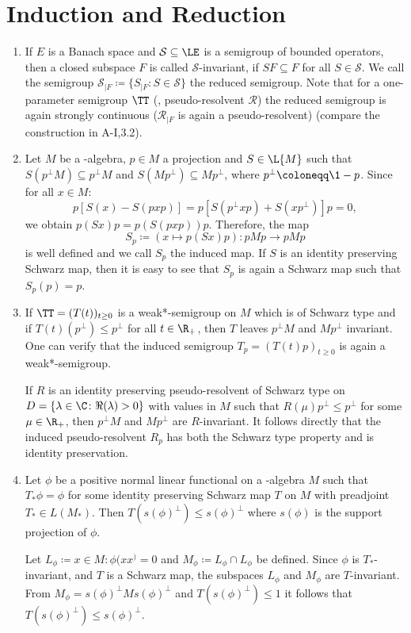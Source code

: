 \section{Induction and Reduction}
%
\begin{enumerate}[1., wide, labelsep=1em, itemindent=\parindent]
\item
If $ E $ is a Banach space and $ \mathcal{S} \subseteq \LE $ is a semigroup of bounded operators, then a closed subspace $ F $ is called $ \mathcal{S} $-invariant, if $ SF \subseteq F $ for all $ S \in \mathcal{S} $.
We call the semigroup $ \mathcal{S}_{\vert F} \coloneqq \{S_{\vert F} \colon S \in \mathcal{S} \} $ the reduced semigroup.
Note that for a one-parameter semigroup $ \TT $ (\resp, pseudo-resolvent $ \mathcal{R} $) the reduced semigroup is again strongly continuous (\resp $ \mathcal{R}_{\vert F} $ is again a pseudo-resolvent) (compare the construction in A-I,3.2).

\item
Let $ M $ be a \WA-algebra, $ p \in M $ a projection and $ S \in \L{M} $ such that $ S(p^{\perp}M) \subseteq p^{\perp}M $ and $ S(Mp^{\perp}) \subseteq Mp^{\perp} $, where $ p^{\perp} \coloneqq \1-p $.
Since for all $ x \in M $:
\[
p[S(x) - S(pxp)] = p[S(p^{\perp}xp) + S(xp^{\perp})]p = 0,
\]
we obtain $ p(Sx)p = p(S(pxp))p $.
Therefore, the map
\[
S_{p} \coloneqq (x \mapsto p(Sx)p) \colon pMp \to pMp
\]
is well defined and we call $ S_{p} $ the induced map.
If $ S $ is an identity preserving Schwarz map, then it is easy to see that $ S_{p} $ is again a Schwarz map such that $ S_{p}(p) = p $.

\item
If $ \TT = (T(t))_{t\geq0} $ is a weak*-semigroup on $ M $ which is of Schwarz type and if $ T(t)(p^{\perp}) \leq p^{\perp} $ for all $ t \in \R_{+} $, then $ T $ leaves $ p^{\perp}M $ and $ Mp^{\perp} $ invariant.
One can verify that the induced semigroup $T_p = (T(t)p)_{t \geq 0}$ is again a weak*-semigroup.

If $ R $ is an identity preserving pseudo-resolvent of Schwarz type on $ D = \{\lambda \in \C \colon \Re(\lambda) > 0\} $ with values in $ M $ such that $ R(\mu)p^{\perp} \leq p^{\perp} $ for some $ \mu \in \R_{+} $, then $ p^{\perp}M $ and $ Mp^{\perp} $ are $ R $-invariant.
It follows directly that the induced pseudo-resolvent $R_p$ has both the Schwarz type property and is identity preservation.

\item
Let $ \phi $ be a positive normal linear functional on a \WA-algebra $ M $ such that $ T_{*}\phi = \phi $ for some identity preserving Schwarz map $ T $ on $ M $ with preadjoint $ T_{*} \in L(M_{*}) $.
Then $ T(s(\phi)^{\perp}) \leq s(\phi)^{\perp} $ where $ s(\phi) $ is the support projection of $ \phi $.

Let $L_\phi \coloneqq {x \in M: \phi(xx^) = 0}$ and $M_\phi \coloneqq L_\phi \cap L_\phi$ be defined.
Since $ \phi $ is $ T_{*} $-invariant, and $ T $ is a Schwarz map, the subspaces $ L_{\phi} $ and $ M_{\phi} $ are $ T $-invariant.
From $ M_{\phi} = s(\phi)^{\perp}Ms(\phi)^{\perp} $ and $ T(s(\phi)^{\perp}) \leq 1 $ it follows that $ T(s(\phi)^{\perp}) \leq s(\phi)^{\perp} $.

\end{enumerate}
